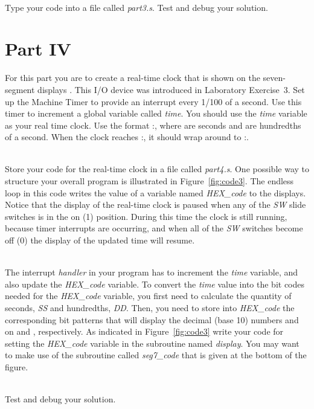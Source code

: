 \documentclass[epsfig,10pt,fullpage]{article}
\begin{document}
~\\
Type your code into a file called {\it part3.s}. Test and debug your solution.

\section*{ Part IV}
For this part you are to create a real-time clock that is shown on the seven-segment 
displays . This I/O device was introduced in Laboratory Exercise~3. 
Set up the Machine Timer to provide an interrupt every 1/100 of a second. Use this
timer to increment a global variable called {\it time}. You should use the {\it time} 
variable as your real time clock. Use the format :, where  
are seconds and  are hundredths of a second.
When the clock reaches :, it should wrap around to :.

~\\
Store your code for the real-time clock in a file called {\it part4.s}. 
One possible way to structure your overall program is illustrated in 
Figure~\ref{fig:code3}. The endless loop in this code writes the value of a variable 
named {\it HEX\_code} to the  displays. Notice that the display of the
real-time clock is paused when any of the {\it SW} slide switches is in the on (1) position. 
During this time the clock is still running, because timer interrupts are occurring, and when 
all of the {\it SW} switches become off (0) the display of the updated time will resume.

~\\
The interrupt {\it handler} in your program has to increment the {\it time} variable, 
and also update the {\it HEX\_code} variable. To convert the {\it time} value into the bit codes
needed for the {\it HEX\_code} variable, you first need to calculate the quantity of seconds,
{\it SS} and hundredths, {\it DD}. Then, you need to store into {\it HEX\_code} the
corresponding bit patterns that will display the decimal (base 10) numbers  and 
 on  and , respectively. As indicated in 
Figure~\ref{fig:code3} write your code for setting the {\it HEX\_code} variable in the
subroutine named {\it display}. You may want to make use of the subroutine called
{\it seg7\_code} that is given at the bottom of the figure. 

~\\
Test and debug your solution.
~\\
\end{document}
